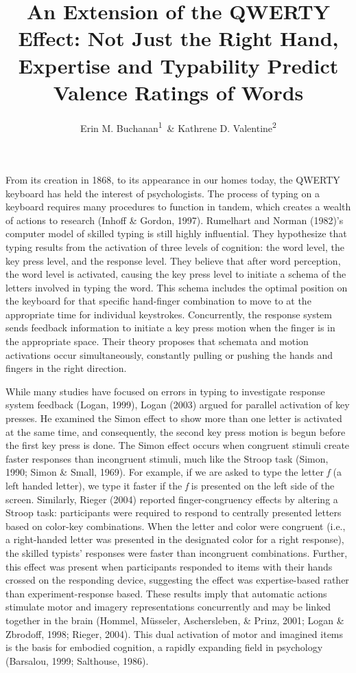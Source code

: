 \documentclass[english,man]{apa6}
\title{An Extension of the QWERTY Effect: Not Just the Right Hand, Expertise
and Typability Predict Valence Ratings of Words}
\author{Erin M. Buchanan\textsuperscript{1}~\& Kathrene D. Valentine\textsuperscript{2}}
\affiliation{
    \vspace{0.5cm}
          \textsuperscript{1} Missouri State University\\
          \textsuperscript{2} University of Missouri  }
\theoremstyle{definition}
\theoremstyle{definition}
\theoremstyle{definition}
\theoremstyle{remark}
\begin{document}
\maketitle

\setcounter{secnumdepth}{0}



From its creation in 1868, to its appearance in our homes today, the
QWERTY keyboard has held the interest of psychologists. The process of
typing on a keyboard requires many procedures to function in tandem,
which creates a wealth of actions to research (Inhoff \& Gordon, 1997).
Rumelhart and Norman (1982)'s computer model of skilled typing is still
highly influential. They hypothesize that typing results from the
activation of three levels of cognition: the word level, the key press
level, and the response level. They believe that after word perception,
the word level is activated, causing the key press level to initiate a
schema of the letters involved in typing the word. This schema includes
the optimal position on the keyboard for that specific hand-finger
combination to move to at the appropriate time for individual
keystrokes. Concurrently, the response system sends feedback information
to initiate a key press motion when the finger is in the appropriate
space. Their theory proposes that schemata and motion activations occur
simultaneously, constantly pulling or pushing the hands and fingers in
the right direction.

While many studies have focused on errors in typing to investigate
response system feedback (Logan, 1999), Logan (2003) argued for parallel
activation of key presses. He examined the Simon effect to show more
than one letter is activated at the same time, and consequently, the
second key press motion is begun before the first key press is done. The
Simon effect occurs when congruent stimuli create faster responses than
incongruent stimuli, much like the Stroop task (Simon, 1990; Simon \&
Small, 1969). For example, if we are asked to type the letter \emph{f}
(a left handed letter), we type it faster if the \emph{f} is presented
on the left side of the screen. Similarly, Rieger (2004) reported
finger-congruency effects by altering a Stroop task: participants were
required to respond to centrally presented letters based on color-key
combinations. When the letter and color were congruent (i.e., a
right-handed letter was presented in the designated color for a right
response), the skilled typists' responses were faster than incongruent
combinations. Further, this effect was present when participants
responded to items with their hands crossed on the responding device,
suggesting the effect was expertise-based rather than
experiment-response based. These results imply that automatic actions
stimulate motor and imagery representations concurrently and may be
linked together in the brain (Hommel, Müsseler, Aschersleben, \& Prinz,
2001; Logan \& Zbrodoff, 1998; Rieger, 2004). This dual activation of
motor and imagined items is the basis for embodied cognition, a rapidly
expanding field in psychology (Barsalou, 1999; Salthouse, 1986).
\end{document}
